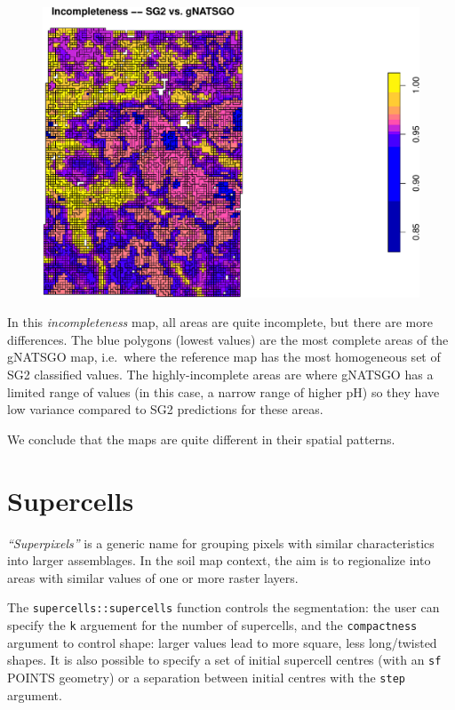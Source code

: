 \documentclass[
  letterpaper,
  DIV=11,
  numbers=noendperiod]{scrartcl}
\begin{document}
\begin{figure}[H]

{\centering \includegraphics{PatternAnalysisWorkshopTutorial_files/figure-pdf/vmaps.gnatsgo.sg.completeness-1.pdf}

}

\end{figure}

In this \emph{incompleteness} map, all areas are quite incomplete, but
there are more differences. The blue polygons (lowest values) are the
most complete areas of the gNATSGO map, i.e.~where the reference map has
the most homogeneous set of SG2 classified values. The highly-incomplete
areas are where gNATSGO has a limited range of values (in this case, a
narrow range of higher pH) so they have low variance compared to SG2
predictions for these areas.

We conclude that the maps are quite different in their spatial patterns.

\hypertarget{supercells}{%
\section{Supercells}\label{supercells}}

\emph{``Superpixels''} is a generic name for grouping pixels with
similar characteristics into larger assemblages. In the soil map
context, the aim is to regionalize into areas with similar values of one
or more raster layers.

The \texttt{supercells::supercells} function controls the segmentation:
the user can specify the \texttt{k} arguement for the number of
supercells, and the \texttt{compactness} argument to control shape:
larger values lead to more square, less long/twisted shapes. It is also
possible to specify a set of initial supercell centres (with an
\texttt{sf} POINTS geometry) or a separation between initial centres
with the \texttt{step} argument.
\end{document}
